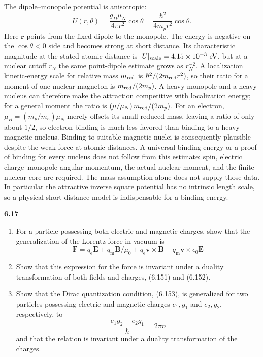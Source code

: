 The dipole--monopole potential is anisotropic:
\[
U(r,\theta)=\frac{g_D\mu_N}{4\pi r^2}\cos\theta
=\frac{\hbar^2}{4m_pr^2}\cos\theta.
\]
Here $\mathbf r$ points from the fixed dipole to the monopole. The energy
is negative on the $\cos\theta<0$ side and becomes strong at short
distance. Its characteristic magnitude at the stated atomic distance is
$|U|_{\rm scale}=4.15\times10^{-3}\ {\rm eV}$, but at a nuclear cutoff
$r_N$ the same point-dipole estimate grows as $r_N^{-2}$.
A localization kinetic-energy scale for relative mass $m_{\rm red}$ is
$\hbar^2/(2m_{\rm red}r^2)$, so their ratio for a moment of one nuclear
magneton is $m_{\rm red}/(2m_p)$. A heavy monopole and a heavy nucleus
can therefore make the attraction competitive with localization energy;
for a general moment the ratio is $(\mu/\mu_N)\,m_{\rm red}/(2m_p)$.
For an electron, $\mu_B=(m_p/m_e)\mu_N$ merely offsets its small reduced
mass, leaving a ratio of only about $1/2$, so electron binding is much
less favored than binding to a heavy magnetic nucleus.
Binding to suitable magnetic nuclei is consequently plausible despite
the weak force at atomic distances. A universal binding energy or a
proof of binding for every nucleus does not follow from this estimate:
spin, electric charge--monopole angular momentum, the actual nuclear
moment, and the finite nuclear core are required. The mass assumption
alone does not supply those data. In particular the attractive inverse
square potential has no intrinsic length scale, so a physical short-distance
model is indispensable for a binding energy.

\par\bigskip
\noindent\textbf{6.17}\quad\begin{enumerate}
\item[(a)] For a particle possessing both electric and magnetic charges, show that the generalization of the Lorentz force in vacuum is
\[
\mathbf{F}=q_{\mathrm{e}}\mathbf{E}+q_{\mathrm{m}}\mathbf{B}/\mu_{0}+q_{\mathrm{e}}\mathbf{v}\times\mathbf{B}-q_{\mathrm{m}}\mathbf{v}\times\epsilon_{0}\mathbf{E}
\]
\item[(b)] Show that this expression for the force is invariant under a duality transformation of both fields and charges, (6.151) and (6.152).
\item[(c)] Show that the Dirac quantization condition, (6.153), is generalized for two particles possessing electric and magnetic charges $e_{1},g_{1}$ and $e_{2},g_{2}$, respectively, to
\[
\frac{e_{1}g_{2}-e_{2}g_{1}}{\hbar}=2\pi n
\]
and that the relation is invariant under a duality transformation of the charges.
\end{enumerate}
\solution

